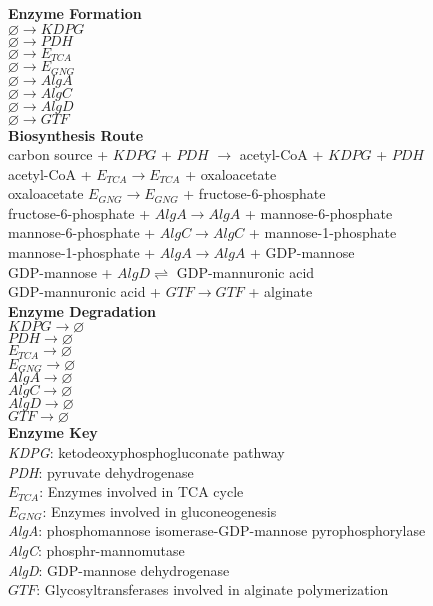 \documentclass[11pt, oneside]{article}   	%
\begin{document}
\begin{center}
\textbf{Enzyme Formation} \\
$\varnothing \rightarrow KDPG$ \\
$\varnothing \rightarrow PDH$ \\
$\varnothing \rightarrow E_{TCA}$ \\
$\varnothing \rightarrow E_{GNG}$ \\
$\varnothing \rightarrow AlgA$ \\
$\varnothing \rightarrow AlgC$ \\
$\varnothing \rightarrow AlgD$ \\
$\varnothing \rightarrow GTF$ \\

\hfill \break
\textbf{Biosynthesis Route} \\
carbon source + $KDPG$ + $PDH$ $\rightarrow$ acetyl-CoA + $KDPG$ + $PDH$ \\
acetyl-CoA + $E_{TCA} \rightarrow E_{TCA}$ + oxaloacetate \\
oxaloacetate $E_{GNG} \rightarrow E_{GNG}$ + fructose-6-phosphate \\
fructose-6-phosphate + $AlgA \rightarrow AlgA$ + mannose-6-phosphate \\
mannose-6-phosphate + $AlgC \rightarrow AlgC$ + mannose-1-phosphate \\
mannose-1-phosphate + $ AlgA \rightarrow AlgA$ + GDP-mannose \\
GDP-mannose + $AlgD  \rightleftharpoons$ GDP-mannuronic acid \\
GDP-mannuronic acid + $GTF \rightarrow GTF$ + alginate \\

\hfill \break
\textbf{Enzyme Degradation} \\
$ KDPG \rightarrow \varnothing$ \\
$ PDH \rightarrow \varnothing$ \\
$ E_{TCA} \rightarrow \varnothing$ \\
$ E_{GNG} \rightarrow \varnothing$ \\
$ AlgA \rightarrow \varnothing$ \\
$ AlgC \rightarrow \varnothing$ \\
$ AlgD \rightarrow \varnothing$ \\
$ GTF \rightarrow \varnothing$ \\

\hfill \break
\textbf{Enzyme Key} \\
\textit{KDPG}: ketodeoxyphosphogluconate pathway \\
\textit{PDH}: pyruvate dehydrogenase \\
$E_{TCA}$: Enzymes involved in TCA cycle \\
$E_{GNG}$: Enzymes involved in gluconeogenesis \\
\textit{AlgA}: phosphomannose isomerase-GDP-mannose pyrophosphorylase \\
\textit{AlgC}: phosphr-mannomutase \\
\textit{AlgD}: GDP-mannose dehydrogenase \\
$GTF$: Glycosyltransferases involved in alginate polymerization


\end{center}
\end{document}
